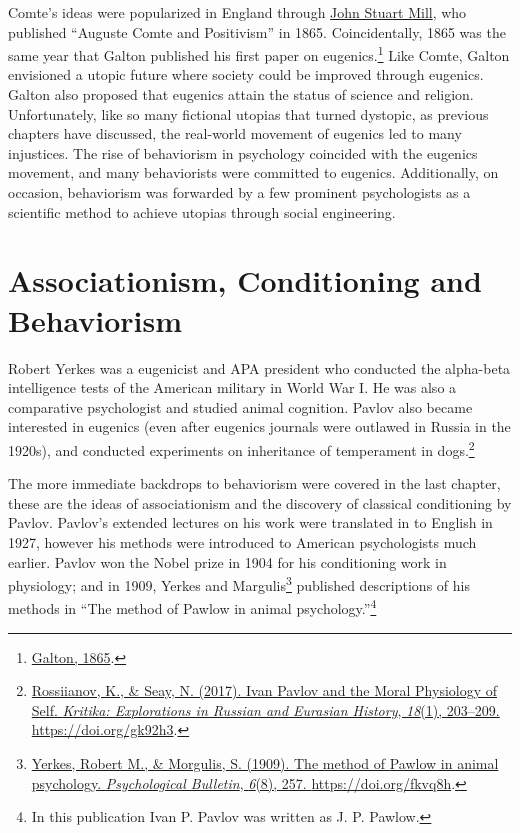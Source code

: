 \documentclass[
  oneside,
  12pt]{crumpbook}
\newenvironment{floatrightbox50}{%
  \wrapfigure{R}{.5\textwidth}%
  }{%
  \endwrapfigure}
\begin{document}
Comte's ideas were popularized in England through \href{https://en.wikipedia.org/wiki/John_Stuart_Mill}{John Stuart Mill}, who published ``Auguste Comte and Positivism'' in 1865. Coincidentally, 1865 was the same year that Galton published his first paper on eugenics.\footnote{\protect\hyperlink{ref-galtonHereditaryTalentCharacter1865}{Galton, 1865}.} Like Comte, Galton envisioned a utopic future where society could be improved through eugenics. Galton also proposed that eugenics attain the status of science and religion. Unfortunately, like so many fictional utopias that turned dystopic, as previous chapters have discussed, the real-world movement of eugenics led to many injustices. The rise of behaviorism in psychology coincided with the eugenics movement, and many behaviorists were committed to eugenics. Additionally, on occasion, behaviorism was forwarded by a few prominent psychologists as a scientific method to achieve utopias through social engineering.

\hypertarget{associationism-conditioning-and-behaviorism}{%
\section{Associationism, Conditioning and Behaviorism}\label{associationism-conditioning-and-behaviorism}}

\begin{floatrightbox50}
Robert Yerkes was a eugenicist and APA president who conducted the alpha-beta intelligence tests of the American military in World War I. He was also a comparative psychologist and studied animal cognition. Pavlov also became interested in eugenics (even after eugenics journals were outlawed in Russia in the 1920s), and conducted experiments on inheritance of temperament in dogs.\footnote{\protect\hyperlink{ref-rossiianovIvanPavlovMoral2017}{Rossiianov, K., \& Seay, N. (2017). Ivan {Pavlov} and the {Moral Physiology} of {Self}. \emph{Kritika: Explorations in Russian and Eurasian History}, \emph{18}(1), 203--209. \url{https://doi.org/gk92h3}}.}

\end{floatrightbox50}

The more immediate backdrops to behaviorism were covered in the last chapter, these are the ideas of associationism and the discovery of classical conditioning by Pavlov. Pavlov's extended lectures on his work were translated in to English in 1927, however his methods were introduced to American psychologists much earlier. Pavlov won the Nobel prize in 1904 for his conditioning work in physiology; and in 1909, Yerkes and Margulis\footnote{\protect\hyperlink{ref-yerkesMethodPawlowAnimal1909}{Yerkes, Robert M., \& Morgulis, S. (1909). The method of {Pawlow} in animal psychology. \emph{Psychological Bulletin}, \emph{6}(8), 257. \url{https://doi.org/fkvq8h}}.} published descriptions of his methods in ``The method of Pawlow in animal psychology.''\footnote{In this publication Ivan P. Pavlov was written as J. P. Pawlow.}
\end{document}

